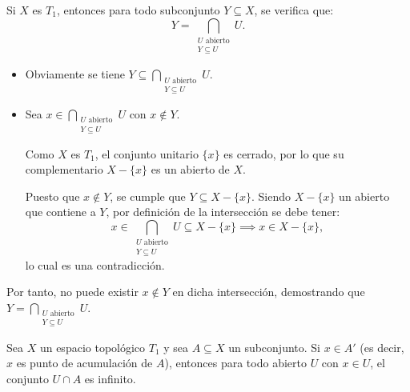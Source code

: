 \bigskip

\begin{ejer}[77]
Si $X$ es $T_1$, entonces para todo subconjunto $Y \subseteq X$, se verifica que:
\[
    Y = \bigcap_{\substack{U \text{ abierto} \\ Y \subseteq U}} U.
\]
\end{ejer}

\begin{sol}
\begin{itemize}
    \item[$\subseteq)$] Obviamente se tiene $Y \subseteq \displaystyle\bigcap_{\substack{U \text{ abierto} \\ Y \subseteq U}} U$.
    
    \item[$\supseteq)$] Sea $x \in \displaystyle\bigcap_{\substack{U \text{ abierto} \\ Y \subseteq U}} U$ con $x \notin Y$.
    
    Como $X$ es $T_1$, el conjunto unitario $\{x\}$ es cerrado, por lo que su complementario $X - \{x\}$ es un abierto de $X$.
    
    Puesto que $x \notin Y$, se cumple que $Y \subseteq X - \{x\}$. Siendo $X - \{x\}$ un abierto que contiene a $Y$, por definición de la intersección se debe tener:
    \[
        x \in \bigcap_{\substack{U \text{ abierto} \\ Y \subseteq U}} U \subseteq X - \{x\} \implies x \in X - \{x\},
    \]
    lo cual es una contradicción.
\end{itemize}
Por tanto, no puede existir $x \notin Y$ en dicha intersección, demostrando que $Y = \displaystyle\bigcap_{\substack{U \text{ abierto} \\ Y \subseteq U}} U$.
\end{sol}

\bigskip

\begin{ejer}
Sea $X$ un espacio topológico $T_1$ y sea $A \subseteq X$ un subconjunto. Si $x \in A'$ (es decir, $x$ es punto de acumulación de $A$), entonces para todo abierto $U$ con $x \in U$, el conjunto $U \cap A$ es infinito.
\end{ejer}

